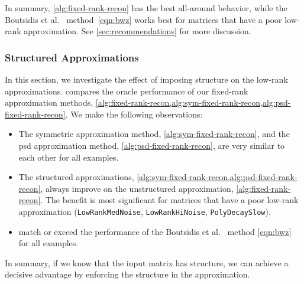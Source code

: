 \documentclass[final]{siamart1116}
\numberwithin{equation}{section}
\numberwithin{theorem}{section}
\numberwithin{figure}{section}
\begin{document}
\vspace{0.5pc}

In summary, \cref{alg:fixed-rank-recon} has the best all-around behavior, while
the Boutsidis et al.~\cite[Thm.~12]{BWZ16:Optimal-Principal-STOC} method~\cref{eqn:bwz}
works best for matrices that have
a poor low-rank approximation.  See \cref{sec:recommendations} for more discussion.








\subsubsection{Structured Approximations}
\label{sec:structured-approx}

In this section, we investigate the effect of imposing structure
on the low-rank approximations.   
compares the oracle performance of our fixed-rank approximation
methods, \cref{alg:fixed-rank-recon,alg:sym-fixed-rank-recon,alg:psd-fixed-rank-recon}.
We make the following observations:

\vspace{0.5pc}

\begin{itemize} \setlength{\itemsep}{0.5pc}
\item	The symmetric approximation method, \cref{alg:sym-fixed-rank-recon},
and the psd approximation method, \cref{alg:psd-fixed-rank-recon}, are very
similar to each other for all examples.

\item	The structured approximations, \cref{alg:sym-fixed-rank-recon,alg:psd-fixed-rank-recon},
always improve on the unstructured approximation, \cref{alg:fixed-rank-recon}.
The benefit is most significant for matrices
that have a poor low-rank approximation
(\texttt{LowRankMedNoise}, \texttt{LowRankHiNoise}, \texttt{PolyDecaySlow}).

\item	{} match or
exceed the performance of the Boutsidis et al.~\cite[Thm.~12]{BWZ16:Optimal-Principal-STOC}
method \cref{eqn:bwz} for all examples.
\end{itemize}

\vspace{0.5pc}

In summary, if we know that the input matrix has structure, we can achieve
a decisive advantage by enforcing the structure in the approximation.
\end{document}
